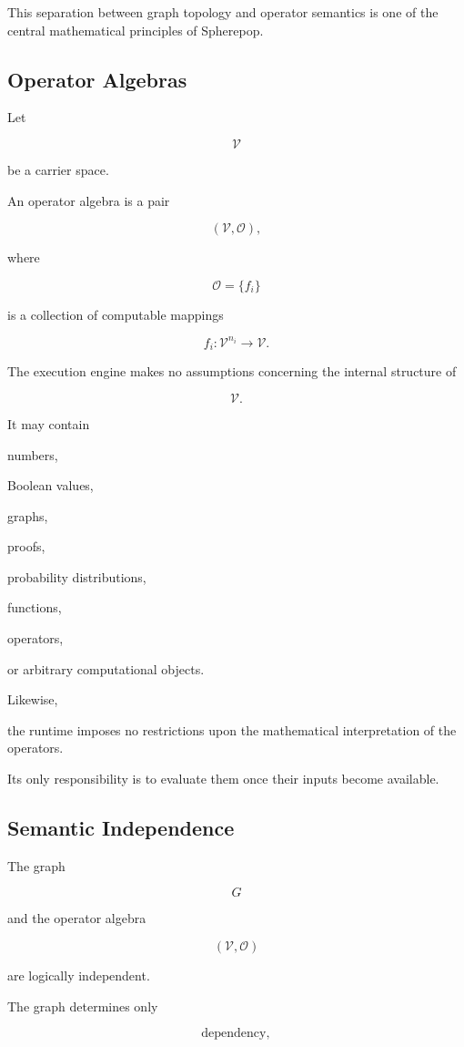 \documentclass[12pt,oneside]{article}
\begin{document}
This separation between graph topology and operator semantics is one of the central mathematical principles of Spherepop.

\subsection{Operator Algebras}

Let

\[
\mathcal V
\]

be a carrier space.

An operator algebra is a pair

\[
(\mathcal V,\mathcal O),
\]

where

\[
\mathcal O
=
\{f_i\}
\]

is a collection of computable mappings

\[
f_i :
\mathcal V^{n_i}
\rightarrow
\mathcal V.
\]

The execution engine makes no assumptions concerning the internal structure of

\[
\mathcal V.
\]

It may contain

numbers,

Boolean values,

graphs,

proofs,

probability distributions,

functions,

operators,

or arbitrary computational objects.

Likewise,

the runtime imposes no restrictions upon the mathematical interpretation of the operators.

Its only responsibility is to evaluate them once their inputs become available.

\subsection{Semantic Independence}

The graph

\[
G
\]

and the operator algebra

\[
(\mathcal V,\mathcal O)
\]

are logically independent.

The graph determines only

\[
\text{dependency},
\]
\end{document}
